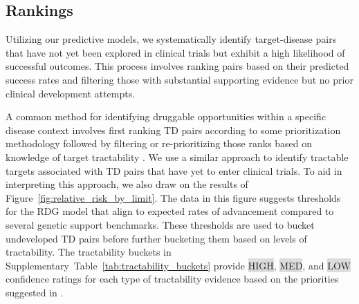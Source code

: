 \documentclass{article}
\begin{document}
\subsection{Rankings}
\label{sec:results_rankings}

Utilizing our predictive models, we systematically identify target-disease pairs that have not yet been explored in clinical trials but exhibit a high likelihood of successful outcomes. This process involves ranking pairs based on their predicted success rates and filtering those with substantial supporting evidence but no prior clinical development attempts.

A common method for identifying druggable opportunities within a specific disease context involves first ranking TD pairs according to some prioritization methodology followed by filtering or re-prioritizing those ranks based on knowledge of target tractability \cite{PMID:28356508,PMID:35401535,PMID:31253980}. We use a similar approach to identify tractable targets associated with TD pairs that have yet to enter clinical trials. To aid in interpreting this approach, we also draw on the results of Figure~\ref{fig:relative_risk_by_limit}. The data in this figure suggests thresholds for the RDG model that align to expected rates of advancement compared to several genetic support benchmarks. These thresholds are used to bucket undeveloped TD pairs before further bucketing them based on levels of tractability. The tractability buckets in Supplementary~Table~\ref{tab:tractability_buckets} provide \colorbox{Gainsboro}{HIGH}, \colorbox{Gainsboro}{MED}, and \colorbox{Gainsboro}{LOW} confidence ratings for each type of tractability evidence based on the priorities suggested in \cite{OTTractability}.
\end{document}
